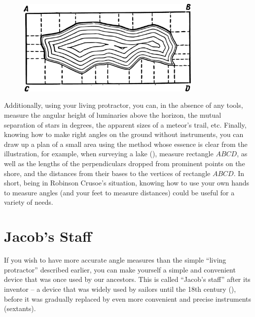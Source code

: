 \begin{figure}[h!]
\centering
\includegraphics[width=0.8\textwidth]{figures/ch-03/fig-068.pdf}
\end{figure}

Additionally, using your living protractor, you can, in the absence of any tools, measure the angular height of luminaries above the horizon, the mutual separation of stars in degrees, the apparent sizes of a meteor's trail, etc. Finally, knowing how to make right angles on the ground without instruments, you can draw up a plan of a small area using the method whose essence is clear from the illustration, for example, when surveying a lake (), measure rectangle $ABCD$, as well as the lengths of the perpendiculars dropped from prominent points on the shore, and the distances from their bases to the vertices of rectangle $ABCD$. In short, being in Robinson Crusoe's situation, knowing how to use your own hands to measure angles (and your feet to measure distances) could be useful for a variety of needs.
\clearpage

\section{Jacob's Staff}
\label{sec-3.8}

If you wish to have more accurate angle measures than the simple ``living protractor'' described earlier, you can make yourself a simple and convenient device that was once used by our ancestors. This is called ``Jacob's staff'' after its inventor -- a device that was widely used by sailors until the 18th century (), before it was gradually replaced by even more convenient and precise instruments (sextants).

